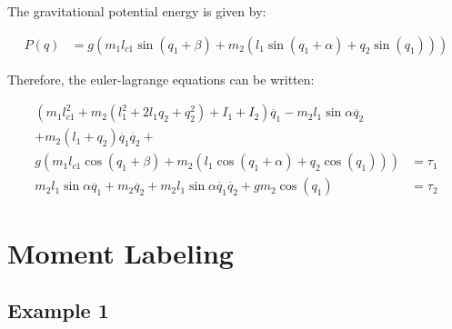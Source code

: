 \documentclass{article}
\begin{document}
The gravitational potential energy is given by:

\begin{align}
P(q) & = g \left( m_1 l_{c1} \sin (q_1 + \beta)   + m_2 \left( l_1 \sin (q_1 + \alpha) + q_2 \sin (q_1) \right) \right)
\end{align}

Therefore, the euler-lagrange equations can be written:

\begin{align}
\left( m_1 l_{c1}^2 + m_2 \left( l_1^2 + 2 l_1 q_2 + q_2^2 \right) + I_1 + I_2 \right)
\ddot{q_1}
- m_2 l_1 \sin \alpha \ddot{q_2} \nonumber \\
+ m_2 (l_1 + q_2) \dot{q_1} \dot{q_2} + \nonumber \\
g \left( m_1 l_{c1} \cos (q_1 + \beta) + m_2 \left( l_1 \cos (q_1 + \alpha) + q_2 \cos (q_1) \right) \right)
& = \tau_1 \\
m_2 l_1 \sin \alpha \ddot{q_1}
+ m_2 \ddot{q_2} + m_2 l_1 \sin \alpha \dot{q_1} \dot{q_2} +
g m_2 \cos (q_1)
& = \tau_2 
\end{align}

\section{Moment Labeling}

\subsection{Example 1}
\end{document}
